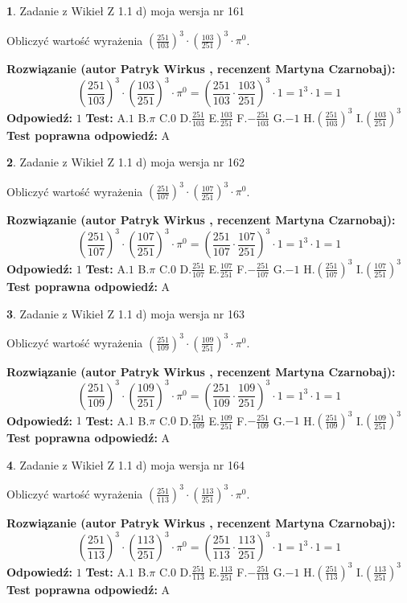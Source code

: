 \documentclass[12pt, a4paper]{article}
\theoremstyle{definition} %
\newtheorem{zad}{}
\newcommand{\zadStart}[1]{\begin{zad}#1\newline}
\newcommand{\zadStop}{\end{zad}}
\newcommand{\rozwStart}[2]{\noindent \textbf{Rozwiązanie (autor #1 , recenzent #2): }\newline}
\newcommand{\rozwStop}{\newline}
\newcommand{\odpStart}{\noindent \textbf{Odpowiedź:}\newline}
\newcommand{\odpStop}{\newline}
\newcommand{\testStart}{\noindent \textbf{Test:}\newline}
\newcommand{\testStop}{\newline}
\newcommand{\kluczStart}{\noindent \textbf{Test poprawna odpowiedź:}\newline}
\newcommand{\kluczStop}{\newline}
\begin{document}
\zadStart{Zadanie z Wikieł Z 1.1 d) moja wersja nr 161}

Obliczyć wartość wyrażenia $(\frac{251}{103})^{3} \cdot (\frac{103}{251})^{3} \cdot \pi^{0}$.
\zadStop
\rozwStart{Patryk Wirkus}{Martyna Czarnobaj}
$$(\frac{251}{103})^{3} \cdot (\frac{103}{251})^{3} \cdot \pi^{0} = (\frac{251}{103} \cdot \frac{103}{251})^{3} \cdot 1 = 1^{3} \cdot 1 = 1$$
\rozwStop
\odpStart
$1$
\odpStop
\testStart
A.$1$ B.$\pi$ C.$0$ D.$\frac{251}{103}$ E.$\frac{103}{251}$
F.$-\frac{251}{103}$ G.$-1$
H.$(\frac{251}{103})^{3}$
I.$(\frac{103}{251})^{3}$
\testStop
\kluczStart
A
\kluczStop



\zadStart{Zadanie z Wikieł Z 1.1 d) moja wersja nr 162}

Obliczyć wartość wyrażenia $(\frac{251}{107})^{3} \cdot (\frac{107}{251})^{3} \cdot \pi^{0}$.
\zadStop
\rozwStart{Patryk Wirkus}{Martyna Czarnobaj}
$$(\frac{251}{107})^{3} \cdot (\frac{107}{251})^{3} \cdot \pi^{0} = (\frac{251}{107} \cdot \frac{107}{251})^{3} \cdot 1 = 1^{3} \cdot 1 = 1$$
\rozwStop
\odpStart
$1$
\odpStop
\testStart
A.$1$ B.$\pi$ C.$0$ D.$\frac{251}{107}$ E.$\frac{107}{251}$
F.$-\frac{251}{107}$ G.$-1$
H.$(\frac{251}{107})^{3}$
I.$(\frac{107}{251})^{3}$
\testStop
\kluczStart
A
\kluczStop



\zadStart{Zadanie z Wikieł Z 1.1 d) moja wersja nr 163}

Obliczyć wartość wyrażenia $(\frac{251}{109})^{3} \cdot (\frac{109}{251})^{3} \cdot \pi^{0}$.
\zadStop
\rozwStart{Patryk Wirkus}{Martyna Czarnobaj}
$$(\frac{251}{109})^{3} \cdot (\frac{109}{251})^{3} \cdot \pi^{0} = (\frac{251}{109} \cdot \frac{109}{251})^{3} \cdot 1 = 1^{3} \cdot 1 = 1$$
\rozwStop
\odpStart
$1$
\odpStop
\testStart
A.$1$ B.$\pi$ C.$0$ D.$\frac{251}{109}$ E.$\frac{109}{251}$
F.$-\frac{251}{109}$ G.$-1$
H.$(\frac{251}{109})^{3}$
I.$(\frac{109}{251})^{3}$
\testStop
\kluczStart
A
\kluczStop



\zadStart{Zadanie z Wikieł Z 1.1 d) moja wersja nr 164}

Obliczyć wartość wyrażenia $(\frac{251}{113})^{3} \cdot (\frac{113}{251})^{3} \cdot \pi^{0}$.
\zadStop
\rozwStart{Patryk Wirkus}{Martyna Czarnobaj}
$$(\frac{251}{113})^{3} \cdot (\frac{113}{251})^{3} \cdot \pi^{0} = (\frac{251}{113} \cdot \frac{113}{251})^{3} \cdot 1 = 1^{3} \cdot 1 = 1$$
\rozwStop
\odpStart
$1$
\odpStop
\testStart
A.$1$ B.$\pi$ C.$0$ D.$\frac{251}{113}$ E.$\frac{113}{251}$
F.$-\frac{251}{113}$ G.$-1$
H.$(\frac{251}{113})^{3}$
I.$(\frac{113}{251})^{3}$
\testStop
\kluczStart
A
\kluczStop
\end{document}

